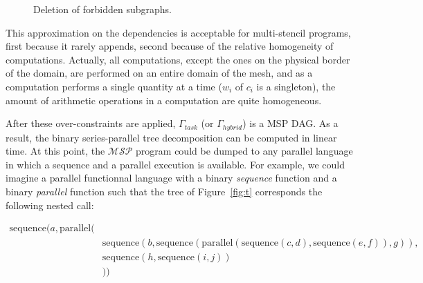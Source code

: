 \begin{figure}[h!]
\begin{center}
\hspace{50pt}
\caption{Deletion of forbidden subgraphs.}
\label{fig:allover}
\end{center}
\end{figure}

This approximation on the dependencies is acceptable for multi-stencil programs, first because it rarely appends, second because of the relative homogeneity of computations. Actually, all computations, except the ones on the physical border of the domain, are performed on an entire domain of the mesh, and as a computation performs a single quantity at a time ($w_i$ of $c_i$ is a singleton), the amount of arithmetic operations in a computation are quite homogeneous.

After these over-constraints are applied, $\Gamma_{task}$ (or $\Gamma_{hybrid}$) is a MSP DAG. As a result, the binary series-parallel tree decomposition can be computed in linear time. At this point, the $\mathcal{MSP}$ program could be dumped to any parallel language in which a sequence and a parallel execution is available. For example, we could imagine a parallel functionnal language with a binary \emph{sequence} function and a binary \emph{parallel} function such that the tree of Figure~\ref{fig:t} corresponds the following nested call:

\begin{equation}
\begin{split}
\text{sequence}(a,\text{parallel}(&\\
&\text{sequence}(b,\text{sequence}(\text{parallel}(\text{sequence}(c,d),\text{sequence}(e,f)),g)),\\
&\text{sequence}(h,\text{sequence}(i,j))\\
&))
\end{split}
\end{equation}